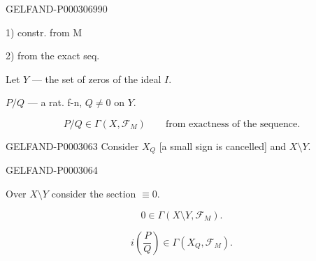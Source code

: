 \begin{GelfandAdjacentEvidence}{GELFAND-P000306}{990}

1) constr. from M

2) from the exact seq.

\end{GelfandAdjacentEvidence}

Let $Y$ --- the set of zeros of the ideal $I$.

$P/Q$ --- a rat. f-n, $Q\ne0$ on $Y$.

\begin{equation*}P/Q\in\Gamma (X,\mathcal F_M)\qquad\text{from exactness of the sequence.}\end{equation*}

\begin{GelfandAdjacentEvidence}{GELFAND-P000306}{3}
Consider $X_Q$ [a small sign is cancelled] and $X\setminus Y$.

\end{GelfandAdjacentEvidence}
\begin{GelfandAdjacentEvidence}{GELFAND-P000306}{4}






\end{GelfandAdjacentEvidence}


Over $X\setminus Y$ consider the section $\equiv0$.

\begin{equation*}0\in\Gamma (X\setminus Y,\mathcal F_M).\end{equation*}

\begin{equation*}i\left (\frac P Q\right)\in\Gamma (X_Q,\mathcal F_M).\end{equation*}

